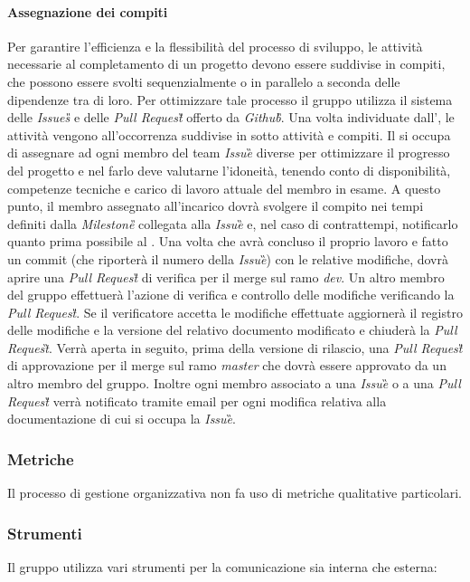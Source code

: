 	\paragraph{Assegnazione dei compiti}
	Per garantire l'efficienza e la flessibilità del processo di sviluppo, le attività necessarie al completamento di un progetto devono essere suddivise in compiti, che possono essere svolti sequenzialmente o in parallelo a seconda delle dipendenze tra di loro. Per ottimizzare tale processo il gruppo utilizza il sistema delle \textit{Issues\G{}} e delle \textit{Pull Request\G{}} offerto da \textit{Github\G}.	
	Una volta individuate dall'\Ana{}, le attività vengono all'occorrenza suddivise in sotto attività e compiti. Il \RdP{} si occupa di assegnare ad ogni membro del team \textit{Issue}\G{} diverse per ottimizzare il progresso del progetto e nel farlo deve valutarne l'idoneità, tenendo conto di disponibilità, competenze tecniche e carico di lavoro attuale del membro in esame. A questo punto, il membro assegnato all'incarico dovrà svolgere il compito nei tempi definiti dalla \textit{Milestone\G{}} collegata alla \textit{Issue}\G{} e, nel caso di contrattempi, notificarlo quanto prima possibile al \RdP{}. Una volta che avrà concluso il proprio lavoro e fatto un commit (che riporterà il numero della \textit{Issue}\G{}) con le relative modifiche, dovrà aprire una \textit{Pull Request\G{}} di verifica per il merge sul ramo \textit{dev}. Un altro membro del gruppo effettuerà l'azione di verifica e controllo delle modifiche verificando la \textit{Pull Request\G{}}. Se il verificatore accetta le modifiche effettuate aggiornerà il registro delle modifiche e la versione del relativo documento modificato e chiuderà la \textit{Pull Request}\G{}. Verrà aperta in seguito, prima della versione di rilascio, una \textit{Pull Request\G{}} di approvazione per il merge sul ramo \textit{master} che dovrà essere approvato da un altro membro del gruppo. Inoltre ogni membro associato a una \textit{Issue}\G{} o a una \textit{Pull Request\G{}} verrà notificato tramite email per ogni modifica relativa alla documentazione %
	di cui si occupa la \textit{Issue}\G{}.
	\subsubsection{Metriche}
	Il processo di gestione organizzativa non fa uso di metriche qualitative particolari.
	\subsubsection{Strumenti}
Il gruppo \teamname{} utilizza vari strumenti per la comunicazione sia interna che esterna:
